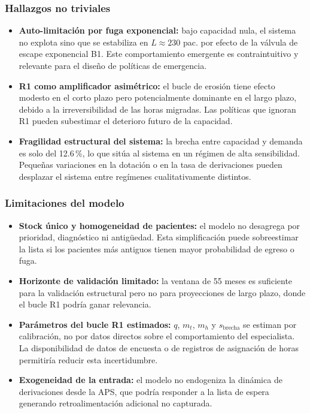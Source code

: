 \documentclass[12pt,a4paper]{article}
\begin{document}
\subsubsection*{Hallazgos no triviales}

\begin{itemize}[leftmargin=1.5cm]
  \item \textbf{Auto-limitación por fuga exponencial:} bajo capacidad nula, el sistema no explota sino que se estabiliza en $L \approx 230$ pac. por efecto de la válvula de escape exponencial B1. Este comportamiento emergente es contraintuitivo y relevante para el diseño de políticas de emergencia.
  \item \textbf{R1 como amplificador asimétrico:} el bucle de erosión tiene efecto modesto en el corto plazo pero potencialmente dominante en el largo plazo, debido a la irreversibilidad de las horas migradas. Las políticas que ignoran R1 pueden subestimar el deterioro futuro de la capacidad.
  \item \textbf{Fragilidad estructural del sistema:} la brecha entre capacidad y demanda es solo del 12.6\,\%, lo que sitúa al sistema en un régimen de alta sensibilidad. Pequeñas variaciones en la dotación o en la tasa de derivaciones pueden desplazar el sistema entre regímenes cualitativamente distintos.
\end{itemize}

\subsubsection*{Limitaciones del modelo}

\begin{itemize}[leftmargin=1.5cm]
  \item \textbf{Stock único y homogeneidad de pacientes:} el modelo no desagrega por prioridad, diagnóstico ni antigüedad. Esta simplificación puede sobreestimar la lista si los pacientes más antiguos tienen mayor probabilidad de egreso o fuga.
  \item \textbf{Horizonte de validación limitado:} la ventana de 55 meses es suficiente para la validación estructural pero no para proyecciones de largo plazo, donde el bucle R1 podría ganar relevancia.
  \item \textbf{Parámetros del bucle R1 estimados:} $q$, $m_t$, $m_h$ y $s_{\text{brecha}}$ se estiman por calibración, no por datos directos sobre el comportamiento del especialista. La disponibilidad de datos de encuesta o de registros de asignación de horas permitiría reducir esta incertidumbre.
  \item \textbf{Exogeneidad de la entrada:} el modelo no endogeniza la dinámica de derivaciones desde la APS, que podría responder a la lista de espera generando retroalimentación adicional no capturada.
\end{itemize}
\end{document}

